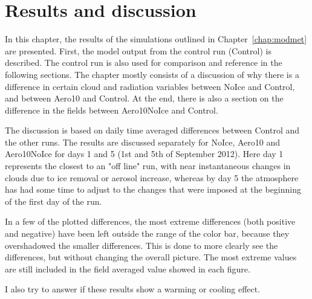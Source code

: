 \chapter{Results and discussion}
\label{chap:results}
In this chapter, the results of the simulations outlined in Chapter~\ref{chap:modmet} are presented. First, the model output from the control run (Control) is described. The control run is also used for comparison and reference in the following sections. The chapter mostly consists of a discussion of why there is a difference in certain cloud and radiation variables between NoIce and Control, and between Aero10 and Control. At the end, there is also a section on the difference in the fields between Aero10NoIce and Control.

The discussion is based on daily time averaged differences between Control and the other runs. The results are discussed separately for NoIce, Aero10 and Aero10NoIce for days 1 and 5 (1st and 5th of September 2012). Here day 1 represents the closest to an "off line" run, with near instantaneous changes in clouds due to ice removal or aerosol increase, whereas by day 5 the atmosphere has had some time to adjust to the changes that were imposed at the beginning of the first day of the run.

In a few of the plotted differences, the most extreme differences (both positive and negative) have been left outside the range of the color bar, because they overshadowed the smaller differences. This is done to more clearly see the differences, but without changing the overall picture. The most extreme values are still included in the field averaged value showed in each figure.

I also try to answer if these results show a warming or cooling effect.%

